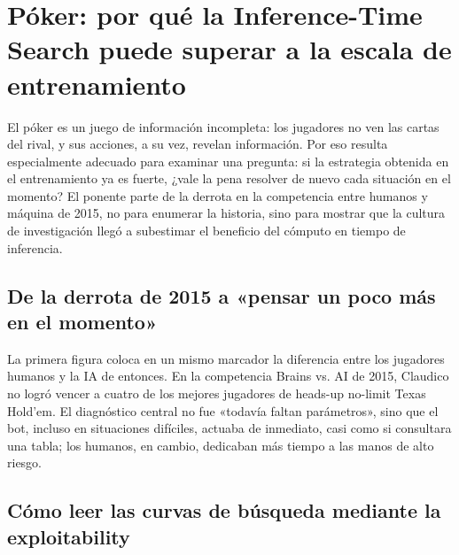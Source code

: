 \section{Póker: por qué la Inference-Time Search puede superar a la escala de entrenamiento}

El póker es un juego de información incompleta: los jugadores no ven las cartas del rival, y sus acciones, a su vez, revelan información. Por eso resulta especialmente adecuado para examinar una pregunta: si la estrategia obtenida en el entrenamiento ya es fuerte, ¿vale la pena resolver de nuevo cada situación en el momento? El ponente parte de la derrota en la competencia entre humanos y máquina de 2015, no para enumerar la historia, sino para mostrar que la cultura de investigación llegó a subestimar el beneficio del cómputo en tiempo de inferencia.

\subsection{De la derrota de 2015 a «pensar un poco más en el momento»}

La primera figura coloca en un mismo marcador la diferencia entre los jugadores humanos y la IA de entonces. En la competencia Brains vs. AI de 2015, Claudico no logró vencer a cuatro de los mejores jugadores de heads-up no-limit Texas Hold'em. El diagnóstico central no fue «todavía faltan parámetros», sino que el bot, incluso en situaciones difíciles, actuaba de inmediato, casi como si consultara una tabla; los humanos, en cambio, dedicaban más tiempo a las manos de alto riesgo.



\subsection{Cómo leer las curvas de búsqueda mediante la exploitability}

